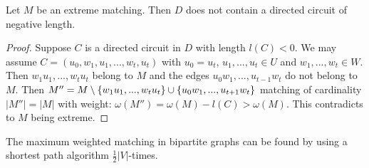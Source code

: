 \begin{thm}
	Let $M$ be an extreme matching. Then $D$ does not contain a directed circuit 
	of negative length.
\end{thm}

\begin{proof}
	Suppose $C$ is a directed circuit in $D$ with length $l(C) < 0$. We may assume 
	$C=(u_0, w_1, u_1, ..., w_t, u_t)$ with $u_0=u_t$, $u_1, ..., u_t \in U$ and 
	$w_1, ..., w_t \in W$. Then $w_1u_1, ..., w_tu_t$ belong to $M$ and the edges 
	$u_0w_1, ..., u_{t-1}w_t$ do not belong to $M$.
	Then $M''=M\setminus \left\{w_1u_1, ..., w_tu_t\right\} \cup \left\{u_0w_1, ..., u_{t+1}w_t\right\}$
	matching of cardinality $|M''| = |M|$ with weight: $\omega(M'') = \omega(M) - l(C) > \omega(M)$.
	This contradicts to $M$ being extreme.
\end{proof}

\begin{cor}
	The maximum weighted matching in bipartite graphs can be found by using a 
	shortest path algorithm $\frac{1}{2}|V|$-times.
\end{cor}
